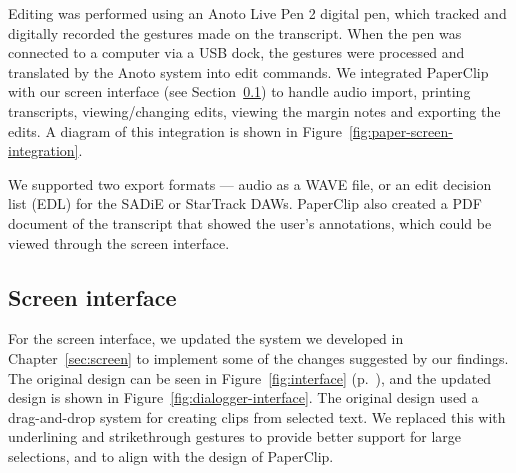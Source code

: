 Editing was performed using an Anoto Live Pen 2 digital pen, which tracked and digitally recorded the gestures made on
the transcript.  When the pen was connected to a computer via a USB dock, the gestures were processed and translated by
the Anoto system into edit commands.  We integrated PaperClip with our screen interface (see
Section~\ref{sec:paper-screen-design}) to handle audio import, printing transcripts, viewing/changing edits, viewing
the margin notes and exporting the edits.  A diagram of this integration is shown in
Figure~\ref{fig:paper-screen-integration}.

We supported two export formats --- audio as a WAVE file, or an edit decision list (EDL) for the SADiE or StarTrack
DAWs.  PaperClip also created a PDF document of the transcript that showed the user's annotations, which could be
viewed through the screen interface.

















\subsection{Screen interface}\label{sec:paper-screen-design}

For the screen interface, we updated the system we developed in Chapter~\ref{sec:screen} to implement some of the
changes suggested by our findings.  The original design can be seen in Figure~\ref{fig:interface}
(p.~\pageref{fig:interface}), and the updated design is shown in Figure~\ref{fig:dialogger-interface}.  The original
design used a drag-and-drop system for creating clips from selected text. We replaced this with underlining and
strikethrough gestures to provide better support for large selections, and to align with the design of PaperClip.

